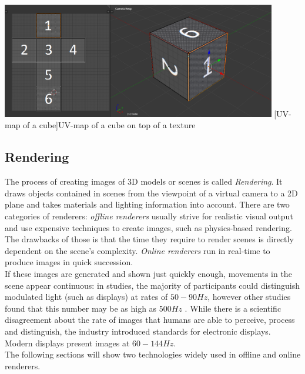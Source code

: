 \begin{center}
    \noindent\includegraphics[width=12cm]{tex/img/ch03/CubeUVMapping.png}
    [UV-map of a cube]{UV-map of a cube on top of a texture}
    \label{fig:3d-cube-uv-mapping}
\end{center}

\subsection{Rendering}
The process of creating images of 3D models or scenes is called \emph{Rendering}. It draws objects contained in scenes from the viewpoint of a virtual camera to a 2D plane and takes materials and lighting information into account. There are two categories of renderers: \emph{offline renderers} usually strive for realistic visual output and use expensive techniques to create images, such as physics-based rendering. The drawbacks of those is that the time they require to render scenes is directly dependent on the scene's complexity. \emph{Online renderers} run in real-time to produce images in quick succession.\\
If these images are generated and shown just quickly enough, movements in the scene appear continuous: in studies, the majority of participants could distinguish modulated light (such as displays) at rates of $50-90 Hz$, however other studies found that this number may be as high as $500 Hz$ \cite{Davis2015}. While there is a scientific disagreement about the rate of images that humans are able to perceive, process and distinguish, the industry introduced standards for electronic displays. Modern displays present images at $60-144 Hz$.\\
The following sections will show two technologies widely used in offline and online renderers.

